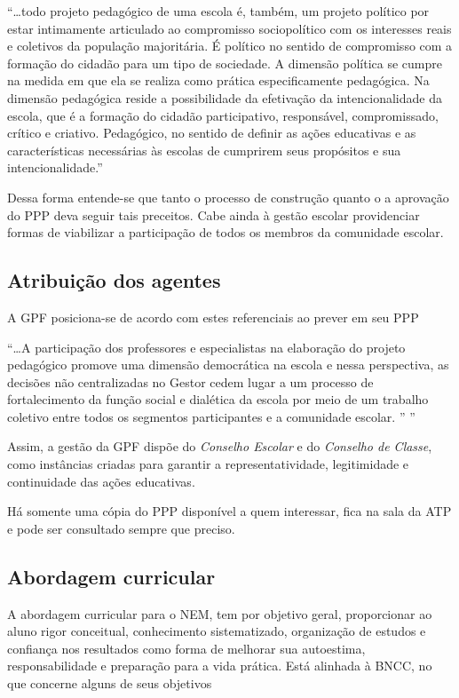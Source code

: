 \begin{citacao}
    ``\ldots todo projeto pedagógico de uma escola é, também, um projeto político por estar intimamente articulado ao compromisso sociopolítico com os interesses reais e coletivos da população majoritária. É político no sentido de compromisso com a formação do cidadão para um tipo de sociedade. A dimensão política se cumpre na medida em que ela se realiza como prática especificamente pedagógica. Na dimensão pedagógica reside a possibilidade da efetivação da intencionalidade da escola, que é a formação do cidadão participativo, responsável, compromissado, crítico e criativo. Pedagógico, no sentido de definir as ações educativas e as características necessárias às escolas de cumprirem seus propósitos e sua intencionalidade.'' 
\end{citacao}
Dessa forma entende-se que tanto o processo de construção quanto o a aprovação do \ac{PPP} deva seguir tais preceitos. Cabe ainda à gestão escolar providenciar formas de viabilizar a participação de todos os membros da comunidade escolar. 

\subsection{Atribuição dos agentes}
A \ac{GPF} posiciona-se de acordo com estes referenciais ao prever em seu \ac{PPP}

\begin{citacao}
    ``\ldots A participação dos professores e especialistas na elaboração do projeto pedagógico promove uma dimensão democrática na escola e nessa perspectiva, as decisões não centralizadas no Gestor cedem lugar a um processo de fortalecimento da função social e dialética da escola por meio de um trabalho coletivo entre todos os segmentos participantes e a comunidade escolar. '' \cite[p. ~5]{GPFPPP:2021}''
\end{citacao}
Assim, a gestão da \ac{GPF} dispõe do \emph{Conselho Escolar} e do \emph{Conselho de Classe}, como instâncias criadas para garantir a representatividade, legitimidade e continuidade das ações educativas.

Há somente uma cópia do \ac{PPP} disponível a quem interessar, fica na sala da \ac{ATP} e pode ser consultado sempre que preciso.

\subsection{Abordagem curricular}
A abordagem curricular para o \ac{NEM}, tem por objetivo geral, proporcionar ao aluno rigor conceitual, conhecimento sistematizado, organização de estudos e confiança nos resultados como forma de melhorar sua autoestima, responsabilidade e preparação para a vida prática. Está alinhada à BNCC, no que concerne alguns de seus objetivos

